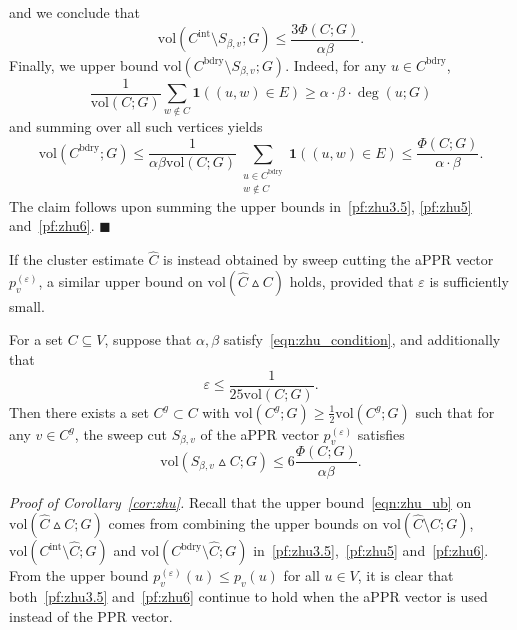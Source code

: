 \documentclass[twoside,11pt]{article}
\newcommand{\1}{\mathbf{1}}
\newcommand{\wh}[1]{\widehat{#1}}
\newcommand{\vol}{\mathrm{vol}}
\newcommand{\qed}{\hfill $\blacksquare$}
\begin{document}
and we conclude that
\begin{equation}
\label{pf:zhu5}
\vol(C^{\mathrm{int}} \setminus S_{\beta,v}; G) \leq \frac{3\Phi(C;G)}{\alpha\beta}.
\end{equation}
Finally, we upper bound $\vol(C^{\mathrm{bdry}} \setminus S_{\beta,v};G)$. Indeed, for any $u \in C^{\mathrm{bdry}}$,
\begin{equation*}
\frac{1}{\vol(C;G)}\sum_{w \not\in C} \1((u,w) \in E) \geq \alpha \cdot \beta \cdot \deg(u;G)
\end{equation*}
and summing over all such vertices yields
\begin{equation}
\label{pf:zhu6}
\vol(C^{\mathrm{bdry}};G) \leq \frac{1}{\alpha \beta \vol(C;G)}\sum_{\substack{u \in C^{\mathrm{bdry}} \\ w \not\in C}} \1((u,w) \in E) \leq \frac{\Phi(C;G)}{\alpha \cdot \beta}.
\end{equation} 
The claim follows upon summing the upper bounds in~\eqref{pf:zhu3.5}, \eqref{pf:zhu5} and~\eqref{pf:zhu6}. \qed

If the cluster estimate $\wh{C}$ is instead obtained by sweep cutting the aPPR vector $p_v^{(\varepsilon)}$, a similar upper bound on $\vol(\wh{C} \vartriangle C)$ holds, provided that $\varepsilon$ is sufficiently small.
\begin{corollary}
	\label{cor:zhu}
	For a set $C \subseteq V$, suppose that $\alpha,\beta$ satisfy~\eqref{eqn:zhu_condition}, and additionally that 
	\begin{equation}
	\label{eqn:zhu_condition_2}
	\varepsilon \leq \frac{1}{25\vol(C;G)}.
	\end{equation}
	Then there exists a set $C^g \subset C$ with $\vol(C^g;G) \geq \frac{1}{2}\vol(C^g;G)$ such that for any $v \in C^g$, the sweep cut $S_{\beta,v}$ of the aPPR vector $p_v^{(\varepsilon)}$ satisfies
	\begin{equation}
	\label{eqn:zhu_ub_appr}
	\vol(S_{\beta,v} \vartriangle C;G) \leq 6\frac{\Phi(C;G)}{\alpha \beta}.
	\end{equation}
\end{corollary}

\noindent \emph{Proof of Corollary~\ref{cor:zhu}.}
Recall that the upper bound~\eqref{eqn:zhu_ub} on $\vol(\wh{C} \vartriangle C;G)$ comes from combining the upper bounds on $\vol(\wh{C} \setminus C;G)$, $\vol(C^{\mathrm{int}} \setminus \wh{C};G)$ and $\vol(C^{\mathrm{bdry}} \setminus \wh{C};G)$ in~\eqref{pf:zhu3.5},~\eqref{pf:zhu5} and~\eqref{pf:zhu6}. From the upper bound $p_v^{(\varepsilon)}(u) \leq p_v(u)$ for all $u \in V$, it is clear that both~\eqref{pf:zhu3.5} and~\eqref{pf:zhu6} continue to hold when the aPPR vector is used instead of the PPR vector. 
\end{document}
